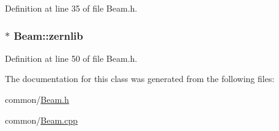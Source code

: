 Definition at line 35 of file Beam.h.

\hypertarget{classBeam_ad41f9e0d00cfe3ed0e5a22a2f3e7c399}{
\subsubsection[{zernlib}]{$\ast$ {\bf Beam::zernlib}}}
\label{classBeam_ad41f9e0d00cfe3ed0e5a22a2f3e7c399}


Definition at line 50 of file Beam.h.



The documentation for this class was generated from the following files:\begin{DoxyCompactItemize}
\item 
common/\hyperlink{Beam_8h}{Beam.h}\item 
common/\hyperlink{Beam_8cpp}{Beam.cpp}\end{DoxyCompactItemize}
